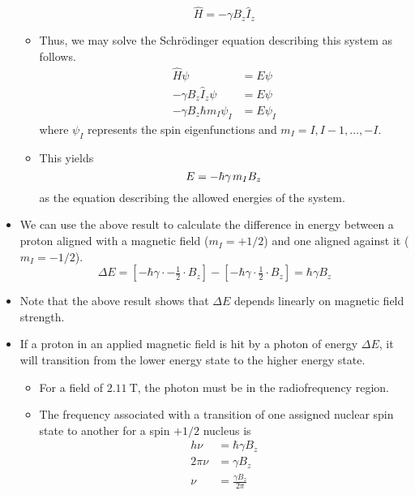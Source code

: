 \documentclass[../notes.tex]{subfiles}
\begin{document}
\begin{itemize}
\begin{itemize}
        \begin{equation*}
            \hat{H} = -\gamma B_z\hat{I}_z
        \end{equation*}
        \item Thus, we may solve the Schr\"{o}dinger equation describing this system as follows.
        \begin{align*}
            \hat{H}\psi &= E\psi\\
            -\gamma B_z\hat{I}_z\psi &= E\psi\\
            -\gamma B_z\hbar m_I\psi_I &= E\psi_I
        \end{align*}
        where $\psi_I$ represents the spin eigenfunctions and $m_I=I,I-1,\dots,-I$.
        \item This yields
        \begin{equation*}
            E = -\hbar\gamma\hspace{0.13em}m_IB_z
        \end{equation*}
        as the equation describing the allowed energies of the system.
    \end{itemize}
    \item We can use the above result to calculate the difference in energy between a proton aligned with a magnetic field ($m_I=+1/2$) and one aligned against it ($m_I=-1/2$).
    \begin{equation*}
        \Delta E = [-\hbar\gamma\cdot -\tfrac{1}{2}\cdot B_z]-[-\hbar\gamma\cdot\tfrac{1}{2}\cdot B_z]
        = \hbar\gamma B_z
    \end{equation*}
    \item Note that the above result shows that $\Delta E$ depends linearly on magnetic field strength.
    \item If a proton in an applied magnetic field is hit by a photon of energy $\Delta E$, it will transition from the lower energy state to the higher energy state.
    \begin{itemize}
        \item For a field of $\SI{2.11}{\tesla}$, the photon must be in the radiofrequency region.
        \item The frequency associated with a transition of one assigned nuclear spin state to another for a spin $+1/2$ nucleus is
        \begin{align*}
            h\nu &= \hbar\gamma B_z\\
            2\pi\nu &= \gamma B_z\\
            \nu &= \frac{\gamma B_z}{2\pi}
        \end{align*}

\end{itemize}
\end{itemize}
\end{document}
